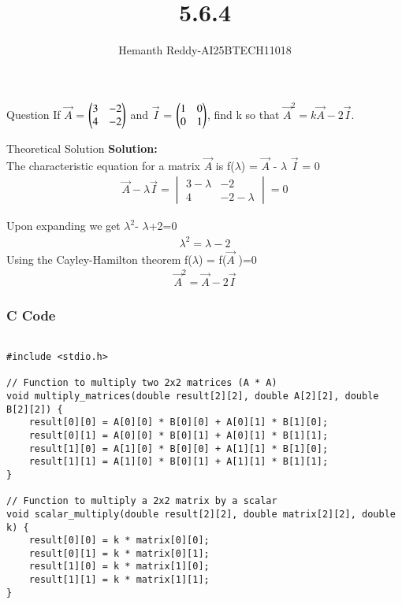 \documentclass{beamer}
\title %
{ 5.6.4}
\author %
{Hemanth Reddy-AI25BTECH11018}
\begin{document}
\frame{\titlepage}
\begin{frame}{Question}
If $\vec{A}$ = $\begin{pmatrix}3&-2\\4&-2\end{pmatrix}$ and $\vec{I}$ = $\begin{pmatrix}1&0\\0&1\end{pmatrix}$, find k so that $\vec{A}^{2}=k\vec{A}-2\vec{I}$.


\end{frame}



\begin{frame}{Theoretical Solution}
\textbf{Solution:}\\

The characteristic equation for a matrix $\vec{A}$ is
f($\lambda$) = $\vec{A}$ - $\lambda$ $\vec{I}$ = 0 \\
\begin{align}
    \vec{A} - \lambda \vec{I} =\begin{vmatrix}
3 - \lambda & -2  \\
4& -2 - \lambda
\end{vmatrix} = 0
\end{align}

Upon expanding we get \qquad $\lambda^2$- $\lambda $+2=0\\
\begin{align}
     \lambda^2 = \lambda  -2
\end{align}
 Using the Cayley-Hamilton theorem f($\lambda$) = f($\vec{A}$ )=0
 \begin{align}
      \vec{A}^2 =  \vec{A}  -2\vec{I}
\end{align}




\end{frame}



\begin{frame}[fragile]
    \frametitle{C Code }
    \begin{lstlisting}

#include <stdio.h>

// Function to multiply two 2x2 matrices (A * A)
void multiply_matrices(double result[2][2], double A[2][2], double B[2][2]) {
    result[0][0] = A[0][0] * B[0][0] + A[0][1] * B[1][0];
    result[0][1] = A[0][0] * B[0][1] + A[0][1] * B[1][1];
    result[1][0] = A[1][0] * B[0][0] + A[1][1] * B[1][0];
    result[1][1] = A[1][0] * B[0][1] + A[1][1] * B[1][1];
}

// Function to multiply a 2x2 matrix by a scalar
void scalar_multiply(double result[2][2], double matrix[2][2], double k) {
    result[0][0] = k * matrix[0][0];
    result[0][1] = k * matrix[0][1];
    result[1][0] = k * matrix[1][0];
    result[1][1] = k * matrix[1][1];
}



    \end{lstlisting}
\end{frame}
\end{document}
